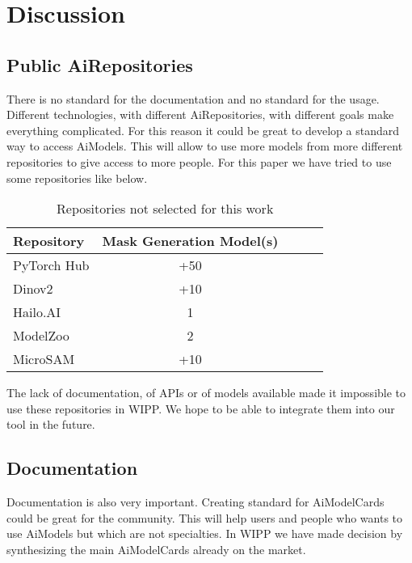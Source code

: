 \section{Discussion}
\label{sec:discussion}

\subsection{Public \Gls{AiRepositories}}

There is no standard for the documentation and no standard for the usage.
Different technologies, with different \Gls{AiRepositories}, with different goals make
everything complicated. For this reason it could be great to develop a standard
way to access \Gls{AiModel}s. This will allow to use more models from more different
repositories to give access to more people. For this paper we have tried to use
some repositories like below.

\begin{table}[H]
    \centering
    \caption{\label{tab:discussion}%
        Repositories not selected for this work
    }
    \begin{tabular}{lcccc}
      \toprule
      Repository & Mask Generation Model(s) \\
      \midrule
      PyTorch Hub & +50 \\
      Dinov2 & +10 \\
      Hailo.AI & 1 \\
      ModelZoo & 2 \\
      MicroSAM & +10 \\
      \bottomrule
    \end{tabular}
\end{table}

The lack of documentation, of \Gls{API}s or of models available made it impossible to
use these repositories in \Gls{WIPP}. We hope to be able to integrate them into our
tool in the future.

\subsection{Documentation}

Documentation is also very important. Creating standard for \Gls{AiModelCard}s could
be great for the community. This will help users and people who wants to use
\Gls{AiModel}s but which are not specialties. In \Gls{WIPP} we have made decision by
synthesizing the main \Gls{AiModelCard}s already on the market.
\cite{MC_Google}
\cite{MC_Paper}
\cite{MC_HuggingFace}
\cite{MC_BioImageIo}
\cite{MC_Tensorflow}

